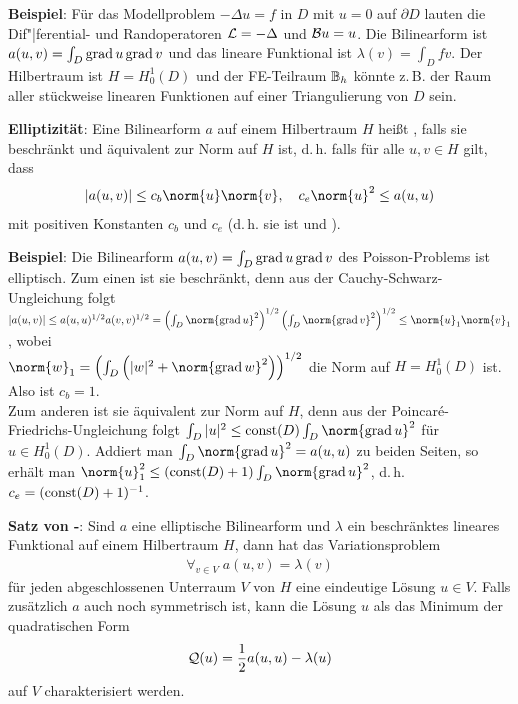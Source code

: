 \linie

\textbf{Beispiel}:
Für das Modellproblem $-\Delta u = f$ in $D$ mit $u = 0$ auf $\partial D$
lauten die Dif"|ferential- und Randoperatoren $\mathcal{L} = -\Delta$ und $\mathcal{B} u = u$.
Die Bilinearform ist $a(u, v) = \int_D \operatorname{grad} u \operatorname{grad} v$ und das lineare Funktional ist
$\lambda(v) = \int_D fv$.
Der Hilbertraum ist $H = H_0^1(D)$ und der FE-Teilraum $\mathbb{B}_h$ könnte z.\,B.
der Raum aller stückweise linearen Funktionen auf einer Triangulierung von $D$ sein.

\linie

\textbf{Elliptizität}:
Eine Bilinearform $a$ auf einem Hilbertraum $H$ heißt , falls
sie beschränkt und äquivalent zur Norm auf $H$ ist, d.\,h. falls für alle $u, v \in H$ gilt, dass
\begin{align*}
    |a(u, v)| \le c_b \norm{u} \norm{v},\quad
    c_e \norm{u}^2 \le a(u, u)
\end{align*}
mit positiven Konstanten $c_b$ und $c_e$
(d.\,h. sie ist  und ).

\linie

\textbf{Beispiel}:
Die Bilinearform $a(u, v) = \int_D \operatorname{grad} u \operatorname{grad} v$ des Poisson-Problems ist elliptisch.
Zum einen ist sie beschränkt, denn aus der Cauchy-Schwarz-Ungleichung folgt\\
$|a(u, v)| \le a(u, u)^{1/2} a(v, v)^{1/2} =
\left(\int_D \norm{\grad u}^2\right)^{1/2} \left(\int_D \norm{\grad v}^2\right)^{1/2}
\le \norm{u}_1 \norm{v}_1$, wobei\\
$\norm{w}_1 = \left(\int_D \left(|w|^2 + \norm{\grad w}^2\right)\right)^{1/2}$
die Norm auf $H = H_0^1(D)$ ist.
Also ist $c_b = 1$.\\
Zum anderen ist sie äquivalent zur Norm auf $H$, denn aus der Poincaré-Friedrichs-Ungleichung folgt
$\int_D |u|^2 \le \const(D) \int_D \norm{\grad u}^2$ für $u \in H_0^1(D)$.
Addiert man $\int_D \norm{\grad u}^2 = a(u, u)$ zu beiden Seiten, so erhält man
$\norm{u}_1^2 \le (\const(D) + 1) \int_D \norm{\grad u}^2$,
d.\,h. $c_e = (\operatorname{const}(D) + 1)^{-1}$.

\linie

\textbf{Satz von -}:
Sind $a$ eine elliptische Bilinearform und $\lambda$ ein beschränktes lineares Funktional auf einem
Hilbertraum $H$, dann hat das Variationsproblem
\begin{align*}
    \forall_{v \in V}\; a(u, v) = \lambda(v)
\end{align*}
für jeden abgeschlossenen Unterraum $V$ von $H$ eine eindeutige Lösung $u \in V$.
Falls zusätzlich $a$ auch noch symmetrisch ist, kann die Lösung $u$ als das Minimum der
quadratischen Form
\begin{align*}
    \mathcal{Q}(u) = \frac{1}{2} a(u, u) - \lambda(u)
\end{align*}
auf $V$ charakterisiert werden.

